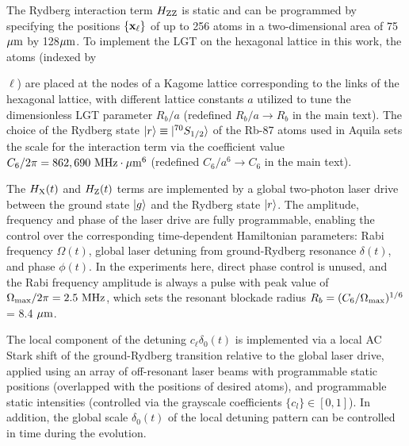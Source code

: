 \documentclass[footinbib,a4paper,aps,superscriptaddress,twocolumn,preprintnumbers,amsmath,amssymb,nobalancelastpage,10pt,prl]{revtex4-2}
\begin{document}
The Rydberg interaction term $H_{\rm ZZ}$ is static and can be programmed by specifying the positions $\{{\bf x}_\ell\}$ of up to 256 atoms in a two-dimensional area of 75${\rm \mu m}$ by 128${\rm \mu m}$. To implement the LGT on the hexagonal lattice in this work, the atoms (indexed by {$\ell$) are placed at the nodes of a Kagome lattice corresponding to the links of the hexagonal lattice, with different lattice constants $a$ utilized to tune the dimensionless LGT parameter $R_b/a$ (redefined $R_b/a \rightarrow R_b$ in the main text). The choice of the Rydberg state $\ket{r} \equiv \ket{^{70}S_{\rm 1/2}}$ of the Rb-87 atoms used in Aquila sets the scale for the interaction term via the coefficient value $C_6/2\pi=862,690 {\rm \ MHz \cdot\mu m^6}$ (redefined $C_6/a^6 \rightarrow C_6$ in the main text).

The $H_{\rm X}(t)$ and $H_{\rm Z}(t)$ terms are implemented by a global two-photon laser drive between the ground state $\ket{g}$ and the Rydberg state $\ket{r}$. The amplitude, frequency and phase of the laser drive are fully programmable, enabling the control over the corresponding time-dependent Hamiltonian parameters: Rabi frequency $\Omega(t)$, global laser detuning from ground-Rydberg resonance $\delta(t)$, and phase $\phi(t)$. In the experiments here, direct phase control is unused, and the Rabi frequency amplitude is always a pulse with peak value of $\Omega_{\rm max}/2\pi = 2.5 \ {\rm MHz}$, which sets the resonant blockade radius $R_b = (C_6/\Omega_{\rm max})^{1/6}$ = 8.4 ${\rm \mu m}$.

The local component of the detuning $c_\ell\delta_0(t)$ is implemented via a local AC Stark shift of the ground-Rydberg transition relative to the global laser drive, applied using an array of off-resonant laser beams with programmable static positions (overlapped with the positions of desired atoms), and programmable static intensities (controlled via the grayscale coefficients $\{c_l\} \in [0,1]$). In addition, the global scale $\delta_0(t)$  of the local detuning pattern can be controlled in time during the evolution.


}
\end{document}
